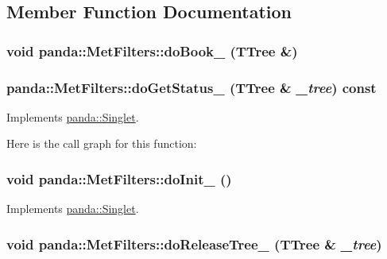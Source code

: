 \subsection{Member Function Documentation}
\hypertarget{classpanda_1_1MetFilters_aa5205e813804df7244ed74a998bf7968}{
\subsubsection[{doBook\_\-}]{\setlength{\rightskip}{0pt plus 5cm}void panda::MetFilters::doBook\_\- (TTree \&)}}
\label{classpanda_1_1MetFilters_aa5205e813804df7244ed74a998bf7968}
\hypertarget{classpanda_1_1MetFilters_ad31a44df0eb98f6402c27fe8cf95b7e3}{
\subsubsection[{doGetStatus\_\-}]{ panda::MetFilters::doGetStatus\_\- (TTree \& {\em \_\-tree}) const}}
\label{classpanda_1_1MetFilters_ad31a44df0eb98f6402c27fe8cf95b7e3}


Implements \hyperlink{classpanda_1_1Singlet_ad2749c2f28a2970eda99db906a116881}{panda::Singlet}.

Here is the call graph for this function:\hypertarget{classpanda_1_1MetFilters_ad21514fd645e1f82276f055f112ad7c4}{
\subsubsection[{doInit\_\-}]{\setlength{\rightskip}{0pt plus 5cm}void panda::MetFilters::doInit\_\- ()}}
\label{classpanda_1_1MetFilters_ad21514fd645e1f82276f055f112ad7c4}


Implements \hyperlink{classpanda_1_1Singlet_af5afe7bf7b223c51d1763953ac24d261}{panda::Singlet}.\hypertarget{classpanda_1_1MetFilters_af78e81492c5936f34a5468848218396e}{
\subsubsection[{doReleaseTree\_\-}]{\setlength{\rightskip}{0pt plus 5cm}void panda::MetFilters::doReleaseTree\_\- (TTree \& {\em \_\-tree})}}
\label{classpanda_1_1MetFilters_af78e81492c5936f34a5468848218396e}


